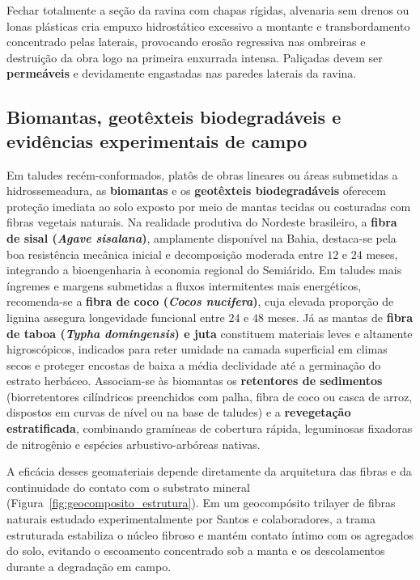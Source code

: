 \begin{boxErro}
Fechar totalmente a seção da ravina com chapas rígidas, alvenaria sem drenos ou lonas plásticas cria empuxo hidrostático excessivo a montante e transbordamento concentrado pelas laterais, provocando erosão regressiva nas ombreiras e destruição da obra logo na primeira enxurrada intensa. Paliçadas devem ser \textbf{permeáveis} e devidamente engastadas nas paredes laterais da ravina.
\end{boxErro}

\subsection{Biomantas, geotêxteis biodegradáveis e evidências experimentais de campo}

Em taludes recém-conformados, platôs de obras lineares ou áreas submetidas a hidrossemeadura, as \textbf{biomantas} e os \textbf{geotêxteis biodegradáveis} oferecem proteção imediata ao solo exposto por meio de mantas tecidas ou costuradas com fibras vegetais naturais. Na realidade produtiva do Nordeste brasileiro, a \textbf{fibra de sisal (\textit{Agave sisalana})}, amplamente disponível na Bahia, destaca-se pela boa resistência mecânica inicial e decomposição moderada entre $12$ e $24$ meses, integrando a bioengenharia à economia regional do Semiárido. Em taludes mais íngremes e margens submetidas a fluxos intermitentes mais energéticos, recomenda-se a \textbf{fibra de coco (\textit{Cocos nucifera})}, cuja elevada proporção de lignina assegura longevidade funcional entre $24$ e $48$ meses. Já as mantas de \textbf{fibra de taboa (\textit{Typha domingensis}) e juta} constituem materiais leves e altamente higroscópicos, indicados para reter umidade na camada superficial em climas secos e proteger encostas de baixa a média declividade até a germinação do estrato herbáceo. Associam-se às biomantas os \textbf{retentores de sedimentos} (biorretentores cilíndricos preenchidos com palha, fibra de coco ou casca de arroz, dispostos em curvas de nível ou na base de taludes) e a \textbf{revegetação estratificada}, combinando gramíneas de cobertura rápida, leguminosas fixadoras de nitrogênio e espécies arbustivo-arbóreas nativas.

A eficácia desses geomateriais depende diretamente da arquitetura das fibras e da continuidade do contato com o substrato mineral (Figura~\ref{fig:geocomposito_estrutura}). Em um geocompósito trilayer de fibras naturais estudado experimentalmente por Santos e colaboradores, a trama estruturada estabiliza o núcleo fibroso e mantém contato íntimo com os agregados do solo, evitando o escoamento concentrado sob a manta e os descolamentos durante a degradação em campo.

